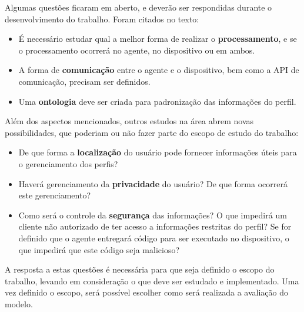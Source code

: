 \documentclass[a4paper, twocolumn]{article}
\begin{document}


Algumas questões ficaram em aberto, e deverão ser respondidas durante o desenvolvimento do trabalho. Foram citados no texto:

\begin{itemize}
  \item É necessário estudar qual a melhor forma de realizar o \textbf{processamento}, e se o processamento ocorrerá no agente, no dispositivo ou em ambos.
  \item A forma de \textbf{comunicação} entre o agente e o dispositivo, bem como a API de comunicação, precisam ser definidos.
  \item Uma \textbf{ontologia} deve ser criada para padronização das informações do perfil.
\end{itemize}

Além dos aspectos mencionados, outros estudos na área abrem novas possibilidades, que poderiam ou não fazer parte do escopo de estudo do trabalho:

\begin{itemize}

  \item De que forma a \textbf{localização} do usuário pode fornecer informações úteis para o gerenciamento dos perfis?

  \item Haverá gerenciamento da \textbf{privacidade} do usuário? De que forma ocorrerá este gerenciamento?

  \item Como será o controle da \textbf{segurança} das informações? O que impedirá um cliente não autorizado de ter acesso a informações restritas do perfil? Se for definido que o agente entregará código para ser executado no dispositivo, o que impedirá que este código seja malicioso?

\end{itemize}

A resposta a estas questões é necessária para que seja definido o escopo do trabalho, levando em consideração o que deve ser estudado e implementado. Uma vez definido o escopo, será possível escolher como será realizada a avaliação do modelo.




\end{document}
